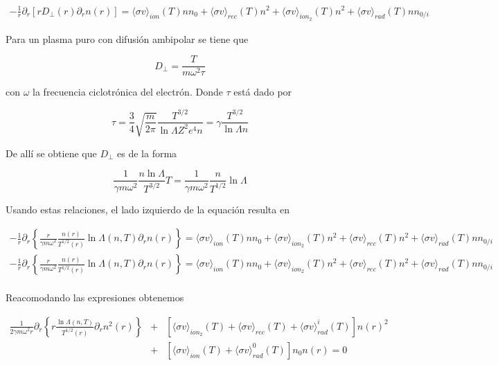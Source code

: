 \begin{eqnarray}
  -\frac{1}{r}\partial_r[rD_\perp(r) \partial_r n(r)] = \langle\sigma v\rangle_{ion}(T)nn_0 + \langle\sigma v\rangle_{rec}(T)n^2 +  \langle\sigma v\rangle_{ion_2}(T)n^2 + \langle\sigma v\rangle_{rad}(T)nn_{0/i}
\end{eqnarray}

Para un plasma puro con difusi\'on ambipolar \cite{helander2005} se tiene que 

\begin{equation*}
  D_\perp = \frac{T}{m\omega^2 \tau}
\end{equation*}

con $\omega$ la frecuencia ciclotr\'onica del electr\'on. Donde $\tau$ est\'a dado por \cite{hazeltine2018} 

\begin{equation*}
  \tau = \frac{3}{4}\sqrt{\frac{m}{2\pi}}\frac{T^{3/2}}{\ln\Lambda Z^2e^4 n} = \gamma\frac{T^{3/2}}{\ln\Lambda n}
\end{equation*}

De all\'i se obtiene que $D_\perp$ es de la forma

\begin{equation}
  \frac{1}{\gamma m\omega^2}\frac{n\ln{\Lambda}}{T^{3/2}}T = \frac{1}{\gamma m\omega^2}\frac{n}{T^{1/2}}\ln{\Lambda}
\end{equation}

Usando estas relaciones, el lado izquierdo de la equaci\'on resulta en

\begin{eqnarray}
-\frac{1}{r}\partial_r\left\{\frac{r}{\gamma m\omega^2}\frac{n(r)}{T^{1/2}(r)}\ln{\Lambda(n,T)}\partial_r n(r)\right\} = \langle\sigma v\rangle_{ion}(T)nn_0 + \langle\sigma v\rangle_{ion_2}(T)n^2 + \langle\sigma v\rangle_{rec}(T)n^2+ \langle\sigma v\rangle_{rad}(T)nn_{0/i} \nonumber\\
 -\frac{1}{r}\partial_r\left\{\frac{r}{\gamma m\omega^2}\frac{n(r)}{T^{1/2}(r)}\ln{\Lambda(n,T)}\partial_r n(r)\right\} = \langle\sigma v\rangle_{ion}(T)nn_0 + \langle\sigma v\rangle_{ion_2}(T)n^2 +\langle\sigma v\rangle_{rec}(T)n^2 + \langle\sigma v\rangle_{rad}(T)nn_{0/i} \nonumber\\
\end{eqnarray}

Reacomodando las expresiones obtenemos

\begin{eqnarray}
  \frac{1}{2\gamma m\omega^2 r}\partial_r\left\{r\frac{\ln{\Lambda(n,T)}}{T^{1/2}(r)}\partial_r n^2(r)\right\} &+& [\langle\sigma v\rangle_{ion_2}(T) + \langle\sigma v\rangle_{rec}(T) + \langle\sigma v\rangle_{rad}^i(T)]n(r)^2 \nonumber \\ &+& [\langle\sigma v\rangle_{ion}(T)+ \langle\sigma v\rangle_{rad}^0(T)]n_0n(r) = 0
\end{eqnarray}


